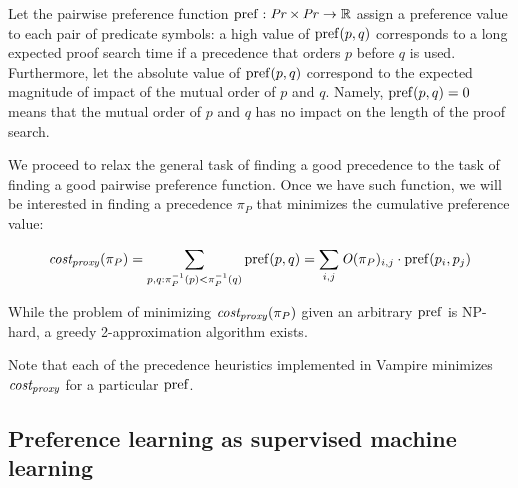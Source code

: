 Let the pairwise preference
function \(\operatorname{pref} : \operatorname{\mathit{Pr}} \times \operatorname{\mathit{Pr}} \rightarrow \operatorname{\mathbb{R}}\)
assign a preference value to each pair of predicate symbols:
a high value of \(\operatorname{pref}(p, q)\) corresponds to a long expected proof search time
if a precedence that orders \(p\) before \(q\) is used.
Furthermore, let the absolute value of \(\operatorname{pref}(p, q)\)
correspond to the expected magnitude of impact of the mutual order of \(p\) and \(q\).
Namely, \(\operatorname{pref}(p, q) = 0\) means that the mutual order of \(p\) and \(q\)
has no impact on the length of the proof search.

We proceed to relax the general task of finding a good precedence
to the task of finding a good pairwise preference function.
Once we have such function,
we will be interested in finding a precedence \(\pi_P\) that minimizes the cumulative preference value:

\begin{align*}
\operatorname{\mathit{cost_{proxy}}}(\pi_P) = \sum_{p, q: \pi_P^{-1}(p) < \pi_P^{-1}(q)} \operatorname{pref}(p, q)
= \sum_{i, j} \operatorname{\mathit{O}}(\pi_P)_{i, j} \cdot \operatorname{pref}(p_i, p_j)
\end{align*}

While the problem of minimizing \(\operatorname{\mathit{cost_{proxy}}}(\pi_P)\) given an arbitrary \(\operatorname{pref}\) is NP-hard,
a greedy 2-approximation algorithm exists.\cite{Cohen2011}

Note that each of the precedence heuristics implemented in Vampire minimizes \(\operatorname{\mathit{cost_{proxy}}}\)
for a particular \(\operatorname{pref}\).

\subsection{Preference learning as supervised machine learning}

